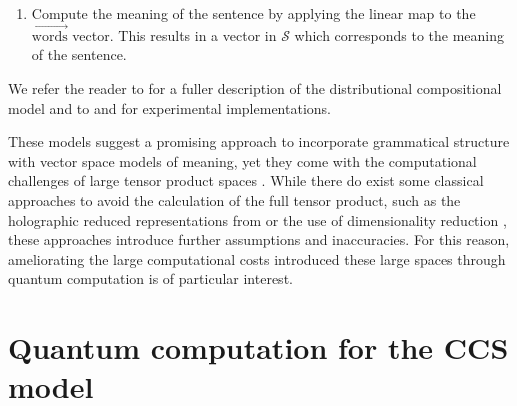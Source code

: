 \begin{enumerate}
\begin{equation}
\begin{aligned}
\begin{tikzpicture}[scale=0.5, yscale=-1]
\begin{pgfonlayer}{edgelayer}
                \draw (0.center) to (1.center);
                \draw (1.center) to (2.center);
                \draw (2.center) to (0.center);
                \draw  (3.center) to (4.center);
                \draw (8.center) to (6.center);
                \draw (6.center) to (7.center);
                \draw (4.center) to (5.center);
                \draw (3.center) to (5.center);
                \draw (8.center) to (7.center);
                \draw (9.center) to (14.center);
                \draw (10.center) to (15.center);
                \draw (11.center) to (16.center);
                \draw (12.center) to (17.center);
                \draw (13.center) to (18.center);
                \draw [thick, bend right=90, looseness=1.25] (24.center) to (25.center);
                \draw [thick, bend right=90, looseness=1.25] (27.center) to (28.center);
                \draw (26.center) to (29.center);
        \end{pgfonlayer}
\end{tikzpicture}
\end{aligned}
\end{equation}

\item Compute the meaning of the sentence by applying the linear map to the $\overrightarrow{\mbox{words}}$ vector. This results in a vector in $\mathcal{S}$ which corresponds to the meaning of the sentence.
\end{enumerate}

\noindent We refer the reader to \cite{coecke2010mathematical} for a fuller description of the distributional compositional model and to \cite{experimental-catcompdist} and \cite{kartsaklis2012unified} for experimental implementations.

These models suggest a promising approach to incorporate grammatical structure with vector space models of meaning, yet they come with the computational challenges of large tensor product spaces \cite{GrefenstetteThesis2013}. While there do exist some classical approaches to avoid the calculation of the full tensor product, such as the holographic reduced representations from \cite{plate1991holographic} or the use of dimensionality reduction \cite{polajnar2013learning}, these approaches introduce further assumptions and inaccuracies.  For this reason, ameliorating the large computational costs introduced these large spaces through quantum computation is of particular interest.

\section{Quantum computation for the CCS model}

